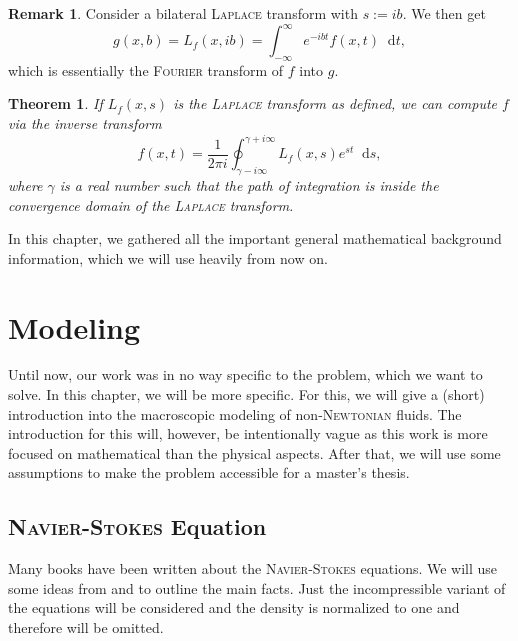 \documentclass[12pt,a4paper,twoside, open=right]{scrreprt}
\theoremstyle{definition}
\newtheorem{rem}[auf]{Remark}
\theoremstyle{plain}
\newtheorem{sa}[auf]{Theorem}
\newcommand{\D}{\mathop{}\!\mathrm{d}}
\begin{document}
\begin{rem}
    Consider a bilateral \textsc{Laplace} transform with $s:=ib$. We then get
    \begin{equation}
        g(x,b)=L_f(x,ib)=\int_{-\infty}^\infty e^{-ibt}f(x,t)\D t,
    \end{equation}
    which is essentially the \textsc{Fourier} transform of $f$ into $g$.
\end{rem}
\begin{sa}
    If $L_f(x,s) $ is the \textsc{Laplace} transform as defined, we can compute $f$ via the inverse transform
    \begin{equation}
        f(x,t) = \frac{1}{2\pi i}\oint_{\gamma-i\infty}^{\gamma +i\infty}L_f(x,s)e^{st}\D s,
    \end{equation}
    where $\gamma$ is a real number such that the path of integration is inside the convergence domain of the \textsc{Laplace} transform.
\end{sa}
In this chapter, we gathered all the important general mathematical background information, which we will use heavily from now on. 
\chapter{Modeling}
\label{ch:model}
Until now, our work was in no way specific to the problem, which we want to solve. In this chapter, we will be more specific. For this, we will give a (short) introduction into the macroscopic modeling of  non-\textsc{Newtonian} fluids. The introduction for this will, however, be intentionally vague as this work is more focused on mathematical than the physical aspects. After that, we will use some assumptions to make the problem accessible for a master's thesis.
\section{\textsc{Navier-Stokes} Equation}
Many books have been written about the \textsc{Navier-Stokes} equations. We will use some ideas from \cite{Lukaszewicz2016} and \cite{White2006} to outline the main facts. Just the incompressible variant of the equations will be considered and the density is normalized to one and therefore will be omitted.
\end{document}

